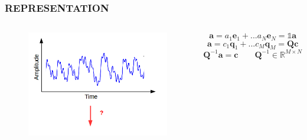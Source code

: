 \documentclass{beamer}
\begin{document}
\begin{frame}[noframenumbering]
\frametitle{REPRESENTATION}
\begin{columns}[c]
\begin{figure}
\includegraphics[width=\textwidth]{rep}
\end{figure}
\[
\textbf{a} = a_{1}\textbf{e}_{1} + ... a_{N}\textbf{e}_{N} = \mathds{1} \textbf{a}
\]
\[
\textbf{a} = c_{1}\textbf{q}_{1} + ... c_{M}\textbf{q}_{M} = \textbf{Q}\textbf{c}
\]
\pause
\[
\textbf{Q}^{-1}\textbf{a} = \textbf{c} \qquad \textbf{Q}^{-1} \in \mathbb{R}^{M \times N}
\]
\end{columns}
\end{frame}
\end{document}
